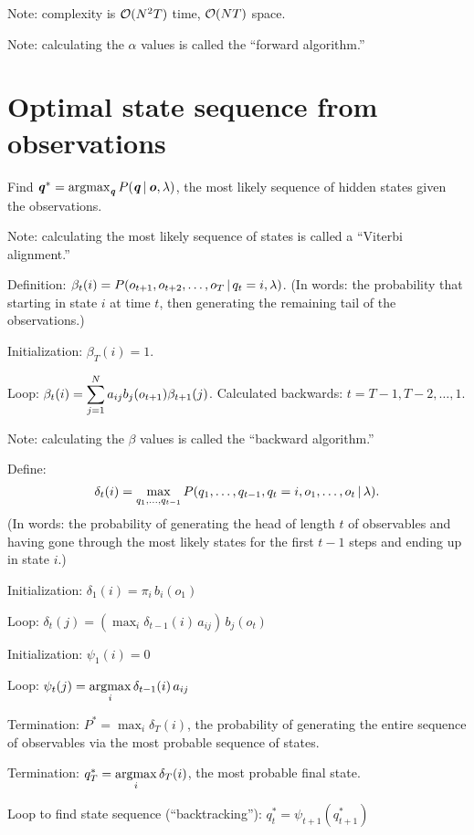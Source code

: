 Note: complexity is $\operatorname{\mathcal{O}}(N^2 T)$ time, $\operatorname{\mathcal{O}}(N T)$ space.

Note: calculating the $\alpha$ values is called the ``forward algorithm.''

\section{Optimal state sequence from observations}

Find $\vv{q}^* = \argmax_{\vv{q}} P(\vv{q} \given \vv{o}, \lam)$,
the most likely sequence of hidden states given the observations.

Note: calculating the most likely sequence of states is called a
``Viterbi alignment.''

Definition: $\beta_t(i)
 = P(o_{t+1}, o_{t+2}, \ldots, o_T \operatorname*{\vert} q_t = i, \lambda)$.
(In words: the probability that starting in state $i$ at time $t$, then
generating the remaining tail of the observations.)

Initialization: $\beta_T(i) = 1$.

Loop: $\beta_t(i) = \displaystyle\sum_{j=1}^N a_{ij} b_j(o_{t+1}) \beta_{t+1}(j)$.
Calculated backwards: $t = T-1, T-2, \ldots, 1$.

Note: calculating the $\beta$ values is called the ``backward algorithm.''

Define:
\begin{equation}
  \delta_t(i)
  = \max_{q_1, \ldots, q_{t-1}}
  P(q_1, \ldots, q_{t-1}, q_t=i, o_1, \ldots, o_t \operatorname*{\vert} \lambda) .
\end{equation}
(In words: the probability of generating the head of length $t$ of
 observables and having gone through the most likely states for
 the first $t-1$ steps and ending up in state $i$.)

Initialization: $\delta_1(i) = \pi_i \, b_i(o_1)$

Loop: $\delta_t(j) = (\displaystyle \max_i \delta_{t-1}(i) \, a_{ij}) \, b_j(o_t)$

Initialization: $\psi_1(i) = 0$

Loop: $\psi_t(j) = \displaystyle \argmax_i \delta_{t-1}(i) \, a_{ij}$

Termination: $P^* = \displaystyle \max_{i} \delta_T(i)$, the probability of
generating the entire sequence of observables via the most probable
sequence of states.

Termination: $q^*_T = \displaystyle \argmax_i \delta_T(i)$, the most probable final
state.

Loop to find state sequence (``backtracking''):
$q_t^* = \psi_{t+1}(q^*_{t+1})$

